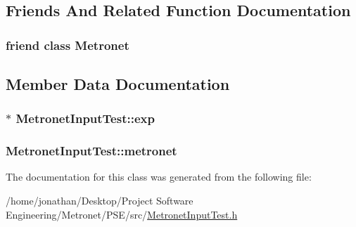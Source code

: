 \subsection{Friends And Related Function Documentation}
\subsubsection[{\texorpdfstring{Metronet}{Metronet}}]{\setlength{\rightskip}{0pt plus 5cm}friend class {\bf Metronet}\hspace{0.3cm}{\ttfamily [friend]}}\hypertarget{class_metronet_input_test_a07c94fb69880743e62f64a941fc2d4ab}{}\label{class_metronet_input_test_a07c94fb69880743e62f64a941fc2d4ab}


\subsection{Member Data Documentation}
\subsubsection[{\texorpdfstring{exp}{exp}}]{$\ast$ Metronet\+Input\+Test\+::exp\hspace{0.3cm}{\ttfamily [protected]}}\hypertarget{class_metronet_input_test_ae16b3047e5801a34ef23dd9314e44770}{}\label{class_metronet_input_test_ae16b3047e5801a34ef23dd9314e44770}
\subsubsection[{\texorpdfstring{metronet}{metronet}}]{ Metronet\+Input\+Test\+::metronet\hspace{0.3cm}{\ttfamily [protected]}}\hypertarget{class_metronet_input_test_ab922ed7c2e4f1dfee1ed7df1eb3a13b4}{}\label{class_metronet_input_test_ab922ed7c2e4f1dfee1ed7df1eb3a13b4}


The documentation for this class was generated from the following file\+:\begin{DoxyCompactItemize}
\item 
/home/jonathan/\+Desktop/\+Project Software Engineering/\+Metronet/\+P\+S\+E/src/\hyperlink{_metronet_input_test_8h}{Metronet\+Input\+Test.\+h}\end{DoxyCompactItemize}
